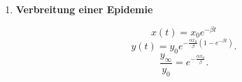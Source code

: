 \begin{enumerate}
          \[
              \dot v=-\frac{k}{m}v^2,
              \qquad
              v(t)=\frac{mv_0}{kv_0t+m}.
          \]
          \[
              x(t)=\frac mk
              \ln\left(\frac{kv_0t+m}{m}\right).
          \]
          \[
              v_\infty=0,
              \qquad
              x_\infty=\infty.
          \]

    \item \textbf{Verbreitung einer Epidemie}

          \[
              x(t)=x_0e^{-\beta t}
          \]
          \[
              y(t)=y_0
              e^{-\frac{\alpha x_0}{\beta}(1-e^{-\beta t})}.
          \]
          \[
              \frac{y_\infty}{y_0}
              =e^{-\frac{\alpha x_0}{\beta}}.
          \]


\end{enumerate}
